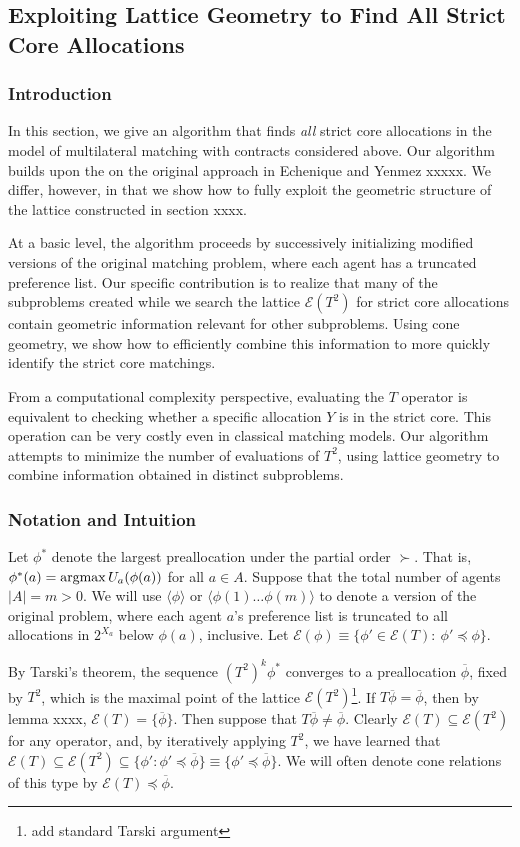 \documentclass[11pt,reqno]{amsart}
\theoremstyle{definition}
\numberwithin{equation}{section}
\newcommand{\ol}{\overline}
\newcommand{\argmax}{\operatornamewithlimits{argmax}}
\newcommand{\pre}{\phi}
\newcommand{\sub}{\subseteq}
\newcommand{\fix}{\mathcal{E}}
\newcommand{\peq}{\preceq}
\newcommand{\su}{\succ}
\newcommand{\toppre}{\ol{\pre}}
\begin{document}
\subsection{Exploiting Lattice Geometry to Find All Strict Core Allocations}
\subsubsection{Introduction}
In this section, we give an algorithm that finds \emph{all} strict core allocations in the model of multilateral matching with contracts considered above.
Our algorithm builds upon the on the original approach in Echenique and Yenmez xxxxx.
We differ, however, in that we show how to fully exploit the geometric structure of the lattice constructed in section xxxx.

At a basic level, the algorithm proceeds by successively initializing modified versions of the original matching problem, where each agent has a truncated preference list.
Our specific contribution is to realize that many of the subproblems created while we search the lattice $\fix(T^2)$ for strict core allocations contain geometric information relevant for other subproblems. 
Using cone geometry, we show how to efficiently combine this information to more quickly identify the strict core matchings. 

From a computational complexity perspective, evaluating the $T$ operator is equivalent to checking whether a specific allocation $Y$ is in the strict core.
This operation can be very costly even in classical matching models.
Our algorithm attempts to minimize the number of evaluations of $T^2$, using lattice geometry to combine information obtained in distinct subproblems.  
\subsubsection{Notation and Intuition} 
Let $\pre^*$ denote the largest preallocation under the partial order $\su$.
That is, $\pre^*(a) = \argmax U_a(\pre(a))$ for all $a \in A$.
Suppose that the total number of agents $|A| = m > 0$.
We will use $\langle \pre \rangle$ or $\langle \pre(1) \hdots \pre(m) \rangle$  to denote a version of the original problem, where each agent $a$'s preference list is truncated to all allocations in $2^{X_a}$ below $\pre(a)$, inclusive. 
Let $\fix(\pre) \equiv \{\pre' \in \fix(T): \: \pre' \peq \pre\}$. 

By Tarski's theorem, the sequence $(T^2)^k \pre^*$ converges to a preallocation $\toppre$, fixed by $T^2$, which is the maximal point of the lattice $\fix(T^2)$\footnote{add standard Tarski argument}.
If $T \toppre = \toppre$, then by lemma xxxx, $\fix(T) = \{\toppre\}$.
Then suppose that $T \toppre \not = \toppre$. 
Clearly $\fix(T) \sub \fix(T^2)$ for any operator, and, by iteratively applying $T^2$, we have learned that $\fix(T) \sub \fix (T^2) \sub \{\pre': \pre' \peq \toppre\} \equiv \{\pre' \peq \toppre\}$. We will often denote cone relations of this type by $\fix(T) \peq \toppre$. 
\end{document}
